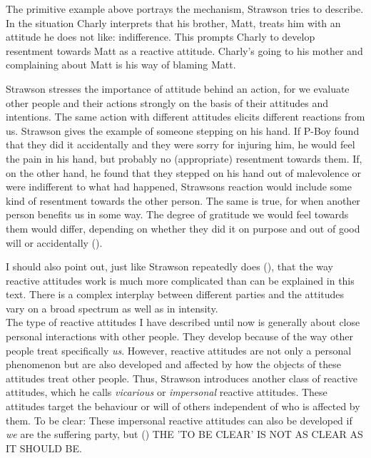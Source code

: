 \documentclass{article}
\newcounter{example}[section]
\begin{document}
The primitive example above portrays the mechanism, Strawson tries to describe.
In the situation Charly interprets that his brother, Matt, treats him with an
attitude he does not like: indifference. This prompts Charly to develop
resentment towards Matt as a reactive attitude. Charly's going to his mother and
complaining about Matt is his way of blaming Matt.

Strawson stresses the importance of attitude behind an action, for we evaluate
other people and their actions strongly on the basis of their attitudes and
intentions. The same action with different attitudes elicits different reactions
from us. Strawson gives the example of someone stepping on his hand. If P-Boy
found that they did it accidentally and they were sorry for injuring him, he
would feel the pain in his hand, but probably no (appropriate) resentment
towards them. If, on the other hand, he found that they stepped on his hand out
of malevolence or were indifferent to what had happened, Strawsons reaction
would include some kind of resentment towards the other person. The same is
true, for when another person benefits us in some way. The degree of gratitude
we would feel towards them would differ, depending on whether they did it on
purpose and out of good will or accidentally (\cite[p.6]{Strawson1962}).



I should also point out, just like Strawson repeatedly does (\cite[p.5,
p.7]{Strawson1962}), that the way reactive attitudes work is much more
complicated than can be explained in this text. There is a complex
interplay between different parties and the attitudes vary on a broad spectrum
as well as in intensity.\\

The type of reactive attitudes I have described until now is generally about close
personal interactions with other people. They develop because of the way other
people treat specifically \textit{us}. 
However, reactive attitudes are not only a personal phenomenon but are also developed
and affected by how the objects of these attitudes treat other people.
Thus, Strawson introduces another class of reactive attitudes, which he calls
\textit{vicarious} or \textit{impersonal} reactive attitudes. These attitudes
target the behaviour or will of others independent of who is affected by them.
To be clear: These impersonal reactive attitudes can also be
developed if \textit{we} are the suffering party, but (\cite[p.15]{Strawson1962})
THE 'TO BE CLEAR' IS NOT AS CLEAR AS IT SHOULD BE.
\end{document}

